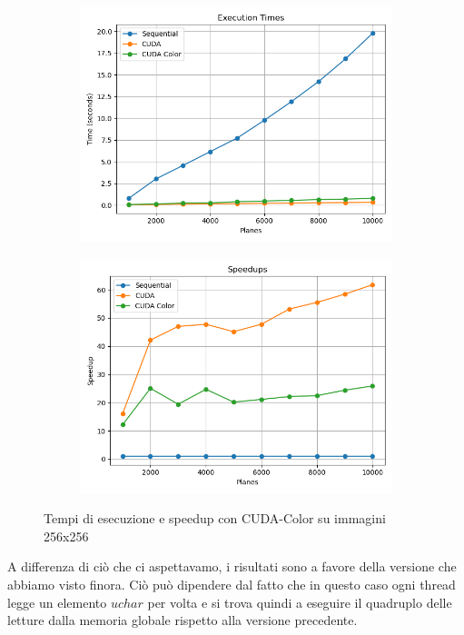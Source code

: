 \begin{figure}[H]
    \centering
    \begin{subfigure}{0.49\textwidth}
        \centering
        \includegraphics[width=\textwidth]{../results/plots/256/cuda_color_times}
    \end{subfigure}
    \begin{subfigure}{0.49\textwidth}
        \centering
        \includegraphics[width=\textwidth]{../results/plots/256/cuda_color_speedup}
    \end{subfigure}
    \caption{Tempi di esecuzione e speedup con CUDA-Color su immagini 256x256}
    \label{fig:cuda_color}
\end{figure}
A differenza di ciò che ci aspettavamo, i risultati sono a favore della versione che abbiamo visto finora.
Ciò può dipendere dal fatto che in questo caso ogni thread legge un elemento $uchar$ per volta e si trova quindi a eseguire il quadruplo delle letture dalla memoria globale rispetto alla versione precedente.

